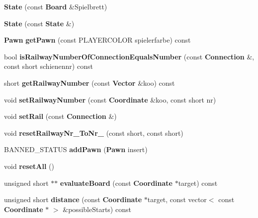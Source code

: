 \begin{DoxyCompactItemize}
\item 
{\bfseries State} (const {\bf Board} \&Spielbrett)\label{class_state_af4b0da86f50a141f59fe722fe2a521e5}

\item 
{\bfseries State} (const {\bf State} \&)\label{class_state_a5ca97340266d486dfa42225f19c40de3}

\item 
{\bf Pawn} {\bfseries get\-Pawn} (const P\-L\-A\-Y\-E\-R\-C\-O\-L\-O\-R spielerfarbe) const \label{class_state_a047b98fadf3b757656fa203e439d6c95}

\item 
bool {\bfseries is\-Railway\-Number\-Of\-Connection\-Equals\-Number} (const {\bf Connection} \&, const short schienennr) const \label{class_state_a0aab91520b80f52278908c673bb80779}

\item 
short {\bfseries get\-Railway\-Number} (const {\bf Vector} \&koo) const \label{class_state_a4ba85094883f4a79e0efd3cfc6088535}

\item 
void {\bfseries set\-Railway\-Number} (const {\bf Coordinate} \&koo, const short nr)\label{class_state_a170bfcb662e80c58f01608c441ddfce4}

\item 
void {\bfseries set\-Rail} (const {\bf Connection} \&)\label{class_state_ac05cee15165658aedfe46bca33e8436b}

\item 
void {\bfseries reset\-Railway\-Nr\-\_\-\-To\-Nr\-\_\-} (const short, const short)\label{class_state_a482b551469c15e5f88967ab6c42ca3dc}

\item 
B\-A\-N\-N\-E\-D\-\_\-\-S\-T\-A\-T\-U\-S {\bfseries add\-Pawn} ({\bf Pawn} insert)\label{class_state_a1f874b300f7f84742b5883f22d0db17f}

\item 
void {\bfseries reset\-All} ()\label{class_state_ae3cf3d6f8fd90d8a59d53ccb1290a46c}

\item 
unsigned short $\ast$$\ast$ {\bfseries evaluate\-Board} (const {\bf Coordinate} $\ast$target) const \label{class_state_ae53ddb9f0ce4e7c94124bf3d809e7983}

\item 
unsigned short {\bfseries distance} (const {\bf Coordinate} $\ast$target, const vector$<$ const {\bf Coordinate} $\ast$ $>$ \&possible\-Starts) const \label{class_state_a4cb65e47fcc3f791c52cf75d904777d5}


\end{DoxyCompactItemize}
